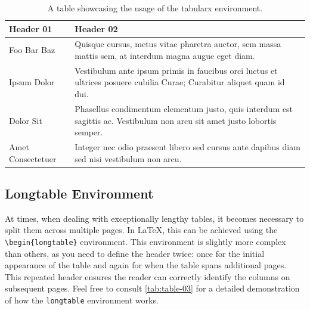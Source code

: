\begin{table}[!htpb]
    \caption{A table showcasing the usage of the tabularx environment.}
    \label{tab:table-02}
    \begin{tabularx}{\textwidth}{lX}
        \toprule
        \textbf{Header 01} & \textbf{Header 02} \\ 
        \midrule
        Foo Bar Baz & Quisque cursus, metus vitae pharetra auctor, sem massa mattis sem, at interdum magna augue eget diam. \\
        Ipsum Dolor & Vestibulum ante ipsum primis in faucibus orci luctus et ultrices posuere cubilia Curae; Curabitur aliquet quam id dui. \\
        Dolor Sit & Phasellus condimentum elementum justo, quis interdum est sagittis ac. Vestibulum non arcu sit amet justo lobortis semper. \\
        Amet Consectetuer & Integer nec odio praesent libero sed cursus ante dapibus diam sed nisi vestibulum non arcu. \\
        \bottomrule
    \end{tabularx}
\end{table}

\subsection{Longtable Environment}
At times, when dealing with exceptionally lengthy tables, it becomes necessary to split them across multiple pages. In \LaTeX, this can be achieved using the \verb|\begin{longtable}| environment. This environment is slightly more complex than others, as you need to define the header twice: once for the initial appearance of the table and again for when the table spans additional pages. This repeated header ensures the reader can correctly identify the columns on subsequent pages. Feel free to consult \autoref{tab:table-03} for a detailed demonstration of how the \verb|longtable| environment works.

